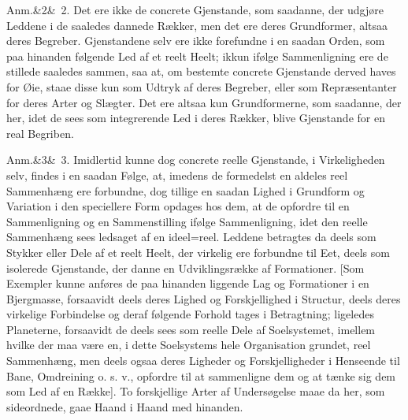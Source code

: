 \documentclass[12pt]{book}
\def\sperr#1{#1}%
\def\textit#1{#1}%
\newcommand{\sperr}[1]{\textls[180]{#1}}
\newcommand{\anm}[1]{%
  \par\vspace{0.5\baselineskip}%
  \noindent\hspace{\parindent}\sperr{Anm.}\ifx&#1&\else~\textit{#1}.\fi
  \enspace\ignorespaces
}
\newcommand{\opage}[1]{\marginnote{\footnotesize\textit{[#1]}}}
\begin{document}
\anm{2} Det ere ikke de concrete Gjenstande, som saadanne, der udgjøre Leddene i
de saaledes dannede Rækker, men det ere deres Grundformer, altsaa deres
Begreber. Gjenstandene selv ere ikke forefundne i en saadan Orden, som paa
hinanden følgende Led af et reelt Heelt; ikkun ifølge Sammenligning ere de
stillede saaledes sammen, saa at, om bestemte concrete Gjenstande derved haves
for Øie, staae disse kun som Udtryk af deres Begreber, eller som Repræsentanter
for deres Arter og Slægter. Det ere altsaa kun Grundformerne, som saadanne, der
her, idet de sees som integrerende Led i deres Rækker, blive Gjenstande for en
real Begriben.
\opage{206} \anm{3} Imidlertid kunne dog concrete reelle Gjenstande, i Virkeligheden selv,
findes i en saadan Følge, at, imedens de formedelst en aldeles reel Sammenhæng
ere forbundne, dog tillige en saadan Lighed i Grundform og Variation i den
speciellere Form opdages hos dem, at de opfordre til en Sammenligning og en
Sammenstilling ifølge Sammenligning, idet den reelle Sammenhæng sees ledsaget af
en ideel=reel. Leddene betragtes da deels som Stykker eller Dele af et reelt
Heelt, der virkelig ere forbundne til Eet, deels som isolerede Gjenstande, der
danne en Udviklingsrække af Formationer. [Som Exempler kunne anføres de paa
hinanden liggende Lag og Formationer i en Bjergmasse, forsaavidt deels deres
Lighed og Forskjellighed i Structur, deels deres virkelige Forbindelse og deraf
følgende Forhold tages i Betragtning; ligeledes Planeterne, forsaavidt de deels
sees som reelle Dele af Soelsystemet, imellem hvilke der maa være en, i dette
Soelsystems hele Organisation grundet, reel Sammenhæng, men deels ogsaa deres
Ligheder og Forskjelligheder i Henseende til Bane, Omdreining o. s. v., opfordre
til at sammenligne dem og at tænke sig dem som Led af en Række]. To forskjellige
Arter af Undersøgelse maae da her, som sideordnede, gaae Haand i Haand med
hinanden.
\end{document}
